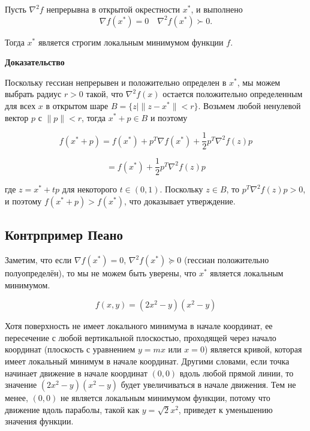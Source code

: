 \documentclass[
  russian,
  letterpaper,
  DIV=11,
  numbers=noendperiod]{scrartcl}
\begin{document}
\begin{tcolorbox}[enhanced jigsaw, opacityback=0, opacitybacktitle=0.6, toptitle=1mm, leftrule=.75mm, bottomrule=.15mm, colbacktitle=quarto-callout-color!10!white, breakable, title=\textcolor{quarto-callout-color}{\faInfo}\hspace{0.5em}{Достаточные условия оптимальности второго порядка}, left=2mm, bottomtitle=1mm, colback=white, titlerule=0mm, arc=.35mm, rightrule=.15mm, toprule=.15mm, coltitle=black, colframe=quarto-callout-color-frame]

Пусть \(\nabla^2 f\) непрерывна в открытой окрестности \(x^*\), и
выполнено \[
\nabla f(x^*) = 0 \quad \nabla^2 f(x^*) \succ 0.
\]

Тогда \(x^*\) является строгим локальным минимумом функции \(f\).

\textbf{Доказательство}

Поскольку гессиан непрерывен и положительно определен в \(x^*\), мы
можем выбрать радиус \(r > 0\) такой, что \(\nabla^2 f(x)\) остается
положительно определенным для всех \(x\) в открытом шаре
\(B = \{ z \mid \|z - x^*\| < r \}\). Возьмем любой ненулевой вектор
\(p\) с \(\|p\| < r\), тогда \(x^* + p \in B\) и поэтому

\[ 
f(x^* + p) = f(x^*) + p^T \nabla f(x^*) + \frac{1}{2} p^T \nabla^2 f(z) p
\]

\[ 
= f(x^*) + \frac{1}{2} p^T \nabla^2 f(z) p
\]

где \(z = x^* + tp\) для некоторого \(t \in (0,1)\). Поскольку
\(z \in B\), то \(p^T \nabla^2 f(z) p > 0\), и поэтому
\(f(x^* + p) > f(x^*)\), что доказывает утверждение.

\end{tcolorbox}

\subsection{Контрпример
Пеано}\label{ux43aux43eux43dux442ux440ux43fux440ux438ux43cux435ux440-ux43fux435ux430ux43dux43e}

Заметим, что если \(\nabla f(x^*) = 0\), \(\nabla^2 f(x^*) \succeq 0\)
(гессиан положительно полуопределён), то мы не можем быть уверены, что
\(x^*\) является локальным минимумом.

\[
f(x,y) = (2x^2 - y)(x^2 - y)
\]

Хотя поверхность не имеет локального минимума в начале координат, ее
пересечение с любой вертикальной плоскостью, проходящей через начало
координат (плоскость с уравнением \(y=mx\) или \(x=0\)) является кривой,
которая имеет локальный минимум в начале координат. Другими словами,
если точка начинает движение в начале координат \((0,0)\) вдоль любой
прямой линии, то значение \((2x^2-y)(x^2 - y)\) будет увеличиваться в
начале движения. Тем не менее, \((0,0)\) не является локальным минимумом
функции, потому что движение вдоль параболы, такой как
\(y=\sqrt{2}x^2\), приведет к уменьшению значения функции.
\end{document}
